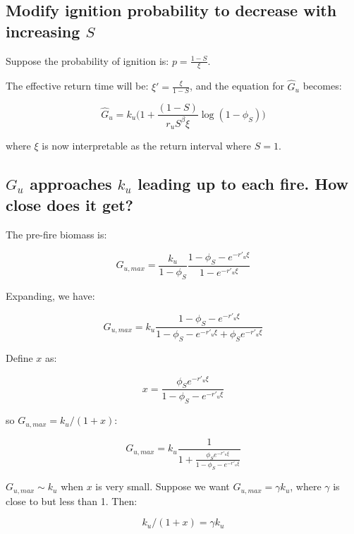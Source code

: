 \documentclass{article}
\begin{document}
\subsection*{Modify ignition probability to decrease with increasing $S$}

Suppose the probability of ignition is: $p = \frac{1-S}{\xi}$.

The effective return time will be: $\xi' = \frac{\xi} { 1- S}$, and the equation for $\hat{G}_u $ becomes:

\begin{equation}
\hat{G}_u =
  k_u \big( 1 + \frac{(1-S)}{r_u S^\beta \xi} \log(1-\phi_S) \big)
\end{equation}

where $\xi$ is now interpretable as the return interval where $S=1$.

 \subsection*{ $G_u$ approaches $k_u$  leading up to each fire. How close does it get?}

The  pre-fire biomass is:

\begin{equation}
  G_{u,max} =  \frac{k_u }{1-\phi_S}   \frac{1- \phi_S - e^{-r'_u \xi} }{1 - e^{-r'_u \xi}}
  \label{G_u_max}
\end{equation}

Expanding, we have:

\begin{equation}
  G_{u,max} =  k_u  \frac{1- \phi_S - e^{-r'_u \xi} }{1  - \phi_S - e^{-r'_u \xi} + \phi_S  e^{-r'_u \xi}}
\end{equation}


Define $x$ as:

\begin{equation}
x = \frac{ \phi_S  e^{-r'_u \xi}}{1- \phi_S - e^{-r'_u \xi}}
\end{equation}

so $ G_{u,max} = k_u /(1+x)$:

\begin{equation}
G_{u,max}  = k_u \frac{1}{1 + \frac{ \phi_S  e^{-r'_u \xi}}{1- \phi_S - e^{-r'_u \xi}}}
\end{equation}


$G_{u,max} \sim k_u$ when $x$ is very small.
Suppose we want $G_{u,max} = \gamma k_u$, where $\gamma$ is close to but less than 1.  Then:


\begin{equation}
 k_u /(1+x) = \gamma k_u
\end{equation}
\end{document}
